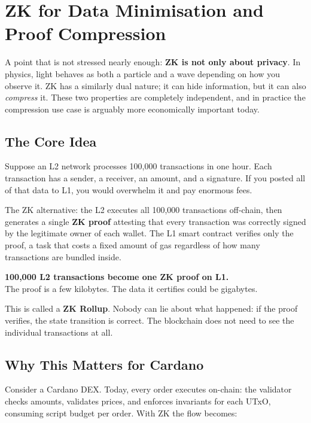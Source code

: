 \section{ZK for Data Minimisation and Proof Compression} \label{sec:compression}

A point that is not stressed nearly enough: \textbf{ZK is not only about privacy}. In physics, light behaves as both a particle and a wave depending on how you observe it. ZK has a similarly dual nature; it can hide information, but it can also \emph{compress} it. These two properties are completely independent, and in practice the compression use case is arguably more economically important today.

\subsection*{The Core Idea}

Suppose an L2 network processes 100,000 transactions in one hour. Each transaction has a sender, a receiver, an amount, and a signature. If you posted all of that data to L1, you would overwhelm it and pay enormous fees.

The ZK alternative: the L2 executes all 100,000 transactions off-chain, then generates a single \textbf{ZK proof} attesting that every transaction was correctly signed by the legitimate owner of each wallet. The L1 smart contract verifies only the proof, a task that costs a fixed amount of gas regardless of how many transactions are bundled inside.

\begin{highlight}
\textbf{100,000 L2 transactions become one ZK proof on L1.}\\
The proof is a few kilobytes. The data it certifies could be gigabytes.
\end{highlight}

This is called a \textbf{ZK Rollup}. Nobody can lie about what happened: if the proof verifies, the state transition is correct. The blockchain does not need to see the individual transactions at all.

\subsection*{Why This Matters for Cardano}

Consider a Cardano DEX. Today, every order executes on-chain: the validator checks amounts, validates prices, and enforces invariants for each UTxO, consuming script budget per order. With ZK the flow becomes:

